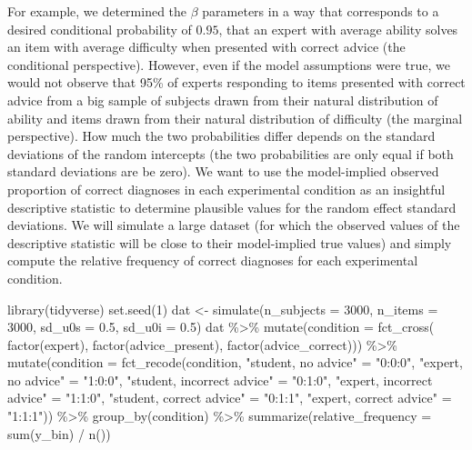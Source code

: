 \documentclass[
  man,
  floatsintext,
  longtable,
  a4paper,
  nolmodern,
  notxfonts,
  notimes,
  colorlinks=true,linkcolor=blue,citecolor=blue,urlcolor=blue]{apa7}
\newenvironment{Shaded}{\begin{snugshade}}{\end{snugshade}}
\newcommand{\AttributeTok}[1]{\textcolor[rgb]{0.40,0.45,0.13}{#1}}
\newcommand{\DecValTok}[1]{\textcolor[rgb]{0.68,0.00,0.00}{#1}}
\newcommand{\FloatTok}[1]{\textcolor[rgb]{0.68,0.00,0.00}{#1}}
\newcommand{\FunctionTok}[1]{\textcolor[rgb]{0.28,0.35,0.67}{#1}}
\newcommand{\NormalTok}[1]{\textcolor[rgb]{0.00,0.23,0.31}{#1}}
\newcommand{\OtherTok}[1]{\textcolor[rgb]{0.00,0.23,0.31}{#1}}
\newcommand{\SpecialCharTok}[1]{\textcolor[rgb]{0.37,0.37,0.37}{#1}}
\newcommand{\StringTok}[1]{\textcolor[rgb]{0.13,0.47,0.30}{#1}}
\begin{document}
For example, we determined the \(\beta\) parameters in a way that
corresponds to a desired conditional probability of \(0.95\), that an
expert with average ability solves an item with average difficulty when
presented with correct advice (the conditional perspective). However,
even if the model assumptions were true, we would not observe that 95\%
of experts responding to items presented with correct advice from a big
sample of subjects drawn from their natural distribution of ability and
items drawn from their natural distribution of difficulty (the marginal
perspective). How much the two probabilities differ depends on the
standard deviations of the random intercepts (the two probabilities are
only equal if both standard deviations are be zero). We want to use the
model-implied observed proportion of correct diagnoses in each
experimental condition as an insightful descriptive statistic to
determine plausible values for the random effect standard deviations. We
will simulate a large dataset (for which the observed values of the
descriptive statistic will be close to their model-implied true values)
and simply compute the relative frequency of correct diagnoses for each
experimental condition.

\begin{Shaded}
\begin{Highlighting}[]
\FunctionTok{library}\NormalTok{(tidyverse)}
\FunctionTok{set.seed}\NormalTok{(}\DecValTok{1}\NormalTok{)}
\NormalTok{dat }\OtherTok{\textless{}{-}} \FunctionTok{simulate}\NormalTok{(}\AttributeTok{n\_subjects =} \DecValTok{3000}\NormalTok{, }\AttributeTok{n\_items =} \DecValTok{3000}\NormalTok{,}
  \AttributeTok{sd\_u0s =} \FloatTok{0.5}\NormalTok{, }\AttributeTok{sd\_u0i =} \FloatTok{0.5}\NormalTok{)}
\NormalTok{dat }\SpecialCharTok{\%\textgreater{}\%} 
  \FunctionTok{mutate}\NormalTok{(}\AttributeTok{condition =} \FunctionTok{fct\_cross}\NormalTok{(}
    \FunctionTok{factor}\NormalTok{(expert), }\FunctionTok{factor}\NormalTok{(advice\_present), }\FunctionTok{factor}\NormalTok{(advice\_correct))) }\SpecialCharTok{\%\textgreater{}\%}
  \FunctionTok{mutate}\NormalTok{(}\AttributeTok{condition =} \FunctionTok{fct\_recode}\NormalTok{(condition,}
 \StringTok{"student, no advice"} \OtherTok{=} \StringTok{"0:0:0"}\NormalTok{, }\StringTok{"expert, no advice"} \OtherTok{=} \StringTok{"1:0:0"}\NormalTok{, }
 \StringTok{"student, incorrect advice"} \OtherTok{=} \StringTok{"0:1:0"}\NormalTok{, }\StringTok{"expert, incorrect advice"} \OtherTok{=} \StringTok{"1:1:0"}\NormalTok{,}
 \StringTok{"student, correct advice"} \OtherTok{=} \StringTok{"0:1:1"}\NormalTok{, }\StringTok{"expert, correct advice"} \OtherTok{=} \StringTok{"1:1:1"}\NormalTok{)) }\SpecialCharTok{\%\textgreater{}\%} 
  \FunctionTok{group\_by}\NormalTok{(condition) }\SpecialCharTok{\%\textgreater{}\%}
  \FunctionTok{summarize}\NormalTok{(}\AttributeTok{relative\_frequency =} \FunctionTok{sum}\NormalTok{(y\_bin) }\SpecialCharTok{/} \FunctionTok{n}\NormalTok{())}
\end{Highlighting}
\end{Shaded}
\end{document}
